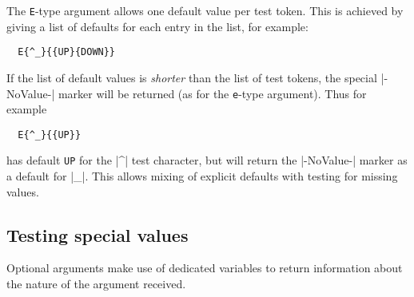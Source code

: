 \documentclass{l3doc}
\begin{document}
The \texttt{E}-type argument allows one default value per test token. This is
achieved by giving a list of defaults for each entry in the list, for example:
\begin{verbatim}
  E{^_}{{UP}{DOWN}}
\end{verbatim}
If the list of default values is \emph{shorter} than the list of test tokens,
the special |-NoValue-| marker will be returned (as for the \texttt{e}-type
argument). Thus for example
\begin{verbatim}
  E{^_}{{UP}}
\end{verbatim}
has default \texttt{UP} for the |^| test character, but will return the
|-NoValue-| marker as a default for |_|. This allows mixing of explicit
defaults with testing for missing values.

\subsection{Testing special values}

Optional arguments make use of dedicated variables to return information about
the nature of the argument received.
\end{document}
